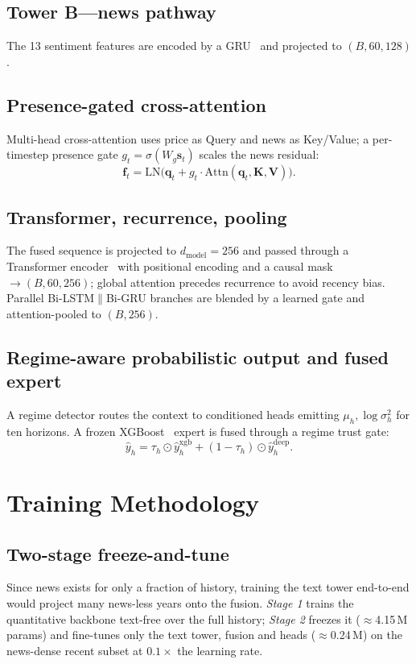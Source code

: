 \documentclass[conference]{IEEEtran}
\begin{document}
\subsection{Tower B---news pathway}
The 13 sentiment features are encoded by a GRU~\cite{gru} and projected to $(B,60,128)$.
\subsection{Presence-gated cross-attention}
Multi-head cross-attention uses price as Query and news as Key/Value; a per-timestep
presence gate $g_t=\sigma(W_g\mathbf{s}_t)$ scales the news residual:
\begin{equation}
\mathbf{f}_t=\mathrm{LN}\!\big(\mathbf{q}_t+g_t\cdot\mathrm{Attn}(\mathbf{q}_t,\mathbf{K},\mathbf{V})\big).
\end{equation}
\subsection{Transformer, recurrence, pooling}
The fused sequence is projected to $d_\text{model}{=}256$ and passed through a Transformer
encoder~\cite{transformer} with positional encoding and a causal mask $\rightarrow(B,60,256)$;
global attention precedes recurrence to avoid recency bias. Parallel Bi-LSTM$\parallel$Bi-GRU
branches are blended by a learned gate and attention-pooled to $(B,256)$.
\subsection{Regime-aware probabilistic output and fused expert}
A regime detector routes the context to conditioned heads emitting $\mu_h,\log\sigma_h^2$
for ten horizons. A frozen XGBoost~\cite{xgboost} expert is fused through a regime trust
gate:
\begin{equation}
\hat{y}_h=\tau_h\odot\hat{y}^{\text{xgb}}_h+(1-\tau_h)\odot\hat{y}^{\text{deep}}_h .
\end{equation}

\section{Training Methodology}
\subsection{Two-stage freeze-and-tune}
Since news exists for only a fraction of history, training the text tower end-to-end would
project many news-less years onto the fusion. \emph{Stage 1} trains the quantitative
backbone text-free over the full history; \emph{Stage 2} freezes it ($\approx$4.15\,M
params) and fine-tunes only the text tower, fusion and heads ($\approx$0.24\,M) on the
news-dense recent subset at $0.1\times$ the learning rate.
\end{document}
